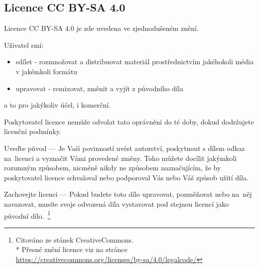 \subsection{Licence CC BY-SA 4.0}
\label{licence CC BY-SA 4.0}
Licence CC BY-SA 4.0 je zde uvedena ve zjednodušeném znění.

Uživatel smí:

\begin{itemize}
    \item   sdílet - rozmnožovat a distribuovat materiál prostřednictvím jakéhokoli média v jakémkoli formátu
    \item   upravovat - remixovat, změnit a vyjít z původního díla
\end{itemize}
a to pro jakýkoliv účel, i komerční.

Poskytovatel licence nemůže odvolat tato oprávnění do té doby, dokud dodržujete licenční podmínky.

Uveďte původ — Je Vaší povinností uvést autorství, poskytnout s dílem odkaz
na~licenci a vyznačit Vámi provedené změny. Toho můžete docílit jakýmkoli
rozumným způsobem, nicméně nikdy ne způsobem naznačujícím, že by poskytovatel
licence schvaloval nebo podporoval Vás nebo Váš způsob užití díla.

Zachovejte licenci — Pokud budete toto dílo upravovat, pozměňovat nebo
na~něj navazovat, musíte svoje odvozená díla vystavovat pod stejnou
licencí jako původní dílo.~\footnote{Citováno ze stánek CreativeCommons. \\*
Přesné znění licence viz na stránce \url{https://creativecommons.org/licenses/by-sa/4.0/legalcode/}}
